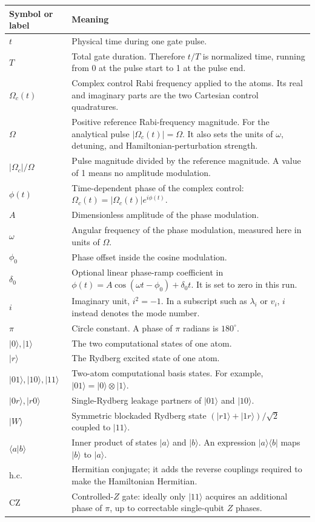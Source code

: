 \documentclass[11pt]{article}
\newcommand{\Om}{\Omega}
\begin{document}
\begin{longtable}{p{}p{}}
\toprule
Symbol or label & Meaning\\
\midrule
\endhead
$t$ & Physical time during one gate pulse.\\
$T$ & Total gate duration.  Therefore $t/T$ is normalized time, running from
0 at the pulse start to 1 at the pulse end.\\
$\Om_c(t)$ & Complex control Rabi frequency applied to the atoms.  Its real
and imaginary parts are the two Cartesian control quadratures.\\
$\Om$ & Positive reference Rabi-frequency magnitude.  For the analytical
pulse $|\Om_c(t)|=\Om$.  It also sets the units of $\omega$, detuning, and
Hamiltonian-perturbation strength.\\
$|\Om_c|/\Om$ & Pulse magnitude divided by the reference magnitude.  A value
of 1 means no amplitude modulation.\\
$\phi(t)$ & Time-dependent phase of the complex control:
$\Om_c(t)=|\Om_c(t)|e^{i\phi(t)}$.\\
$A$ & Dimensionless amplitude of the phase modulation.\\
$\omega$ & Angular frequency of the phase modulation, measured here in units
of $\Om$.\\
$\phi_0$ & Phase offset inside the cosine modulation.\\
$\delta_0$ & Optional linear phase-ramp coefficient in
$\phi(t)=A\cos(\omega t-\phi_0)+\delta_0t$.  It is set to zero in this run.\\
$i$ & Imaginary unit, $i^2=-1$.  In a subscript such as $\lambda_i$ or
$v_i$, $i$ instead denotes the mode number.\\
$\pi$ & Circle constant.  A phase of $\pi$ radians is $180^\circ$.\\
$|0\rangle,|1\rangle$ & The two computational states of one atom.\\
$|r\rangle$ & The Rydberg excited state of one atom.\\
$|01\rangle,|10\rangle,|11\rangle$ & Two-atom computational basis states.
For example, $|01\rangle=|0\rangle\otimes|1\rangle$.\\
$|0r\rangle,|r0\rangle$ & Single-Rydberg leakage partners of
$|01\rangle$ and $|10\rangle$.\\
$|W\rangle$ & Symmetric blockaded Rydberg state
$\left(|r1\rangle+|1r\rangle\right)/\sqrt{2}$ coupled to $|11\rangle$.\\
$\langle a|b\rangle$ & Inner product of states $|a\rangle$ and $|b\rangle$.
An expression $|a\rangle\langle b|$ maps $|b\rangle$ to $|a\rangle$.\\
$\mathrm{h.c.}$ & Hermitian conjugate; it adds the reverse couplings required
to make the Hamiltonian Hermitian.\\
CZ & Controlled-$Z$ gate: ideally only $|11\rangle$ acquires an additional
phase of $\pi$, up to correctable single-qubit $Z$ phases.\\
\bottomrule
\end{longtable}
\end{document}
